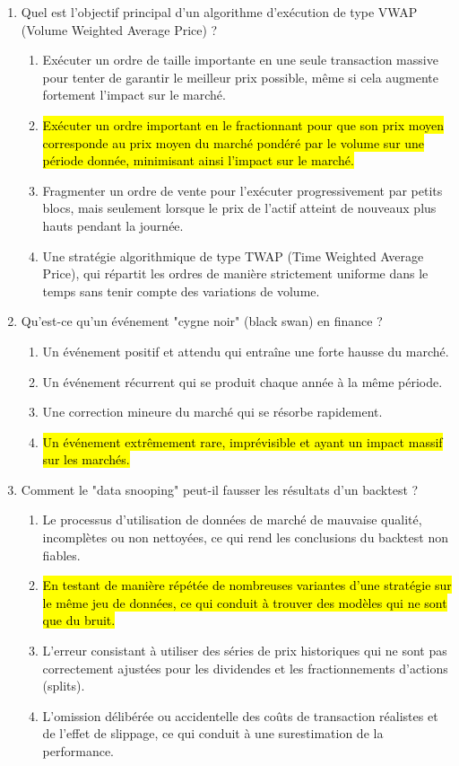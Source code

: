 \documentclass[a4paper,12pt]{article}
\begin{document}
\begin{enumerate}
    \item Quel est l'objectif principal d'un algorithme d'exécution de type VWAP (Volume Weighted Average Price) ?
    \begin{enumerate}[label=(\Alph*)]
        \item Exécuter un ordre de taille importante en une seule transaction massive pour tenter de garantir le meilleur prix possible, même si cela augmente fortement l'impact sur le marché.
        \item \hl{Exécuter un ordre important en le fractionnant pour que son prix moyen corresponde au prix moyen du marché pondéré par le volume sur une période donnée, minimisant ainsi l'impact sur le marché.}
        \item Fragmenter un ordre de vente pour l'exécuter progressivement par petits blocs, mais seulement lorsque le prix de l'actif atteint de nouveaux plus hauts pendant la journée.
        \item Une stratégie algorithmique de type TWAP (Time Weighted Average Price), qui répartit les ordres de manière strictement uniforme dans le temps sans tenir compte des variations de volume.
    \end{enumerate}
    \item Qu'est-ce qu'un événement "cygne noir" (black swan) en finance ?
    \begin{enumerate}[label=(\Alph*)]
        \item Un événement positif et attendu qui entraîne une forte hausse du marché.
        \item Un événement récurrent qui se produit chaque année à la même période.
        \item Une correction mineure du marché qui se résorbe rapidement.
        \item \hl{Un événement extrêmement rare, imprévisible et ayant un impact massif sur les marchés.}
    \end{enumerate}
    
    \item Comment le "data snooping" peut-il fausser les résultats d'un backtest ?
    \begin{enumerate}[label=(\Alph*)]
        \item Le processus d'utilisation de données de marché de mauvaise qualité, incomplètes ou non nettoyées, ce qui rend les conclusions du backtest non fiables.
        \item \hl{En testant de manière répétée de nombreuses variantes d'une stratégie sur le même jeu de données, ce qui conduit à trouver des modèles qui ne sont que du bruit.}
        \item L'erreur consistant à utiliser des séries de prix historiques qui ne sont pas correctement ajustées pour les dividendes et les fractionnements d'actions (splits).
        \item L'omission délibérée ou accidentelle des coûts de transaction réalistes et de l'effet de slippage, ce qui conduit à une surestimation de la performance.
    \end{enumerate}


\end{enumerate}
\end{document}

